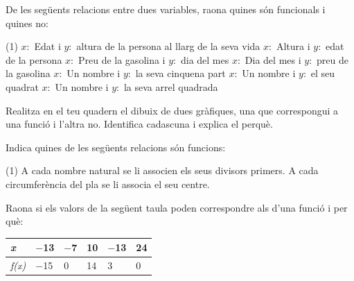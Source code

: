 \begin{mylist}
 
\exer \mental De les següents relacions entre dues variables, raona quines són funcionals i quines no:
\begin{tasks}(1)
   \task $x:$ Edat i $y:$ altura de la persona al llarg de la seva vida \hspace{1cm} \dotfill \hspace{1cm}
   \task $x:$ Altura i $y:$ edat de la persona \hspace{1cm} \dotfill \hspace{1cm}
   \task $x:$ Preu de la gasolina i $y:$ dia del mes \hspace{1cm} \dotfill \hspace{1cm}
   \task $x:$ Dia del mes i $y:$ preu de la gasolina \hspace{1cm} \dotfill \hspace{1cm}
   \task $x:$ Un nombre i $y:$ la seva cinquena part \hspace{1cm} \dotfill \hspace{1cm}
   \task $x:$ Un nombre i $y:$ el seu quadrat \hspace{1cm} \dotfill \hspace{1cm}
   \task $x:$ Un nombre i $y:$ la seva arrel quadrada \hspace{1cm} \dotfill \hspace{1cm}
\end{tasks}

\answers{[Sí, No, No, Sí, Sí, Sí, No]}

\exer  Realitza en el teu quadern el dibuix de dues gràfiques, una que correspongui a una funció i l'altra no. Identifica cadascuna i explica el perquè. 


\exer  Indica quines de les següents relacions són funcions:
\begin{tasks}(1)
	\task    A cada nombre natural se li associen els seus divisors primers.
	\task   A cada circumferència del pla se li associa el seu centre.
\end{tasks}


\exer  Raona si els valors de la següent taula poden correspondre als d'una funció i per què:


\begin{longtable}{|p{0.4in}|p{0.4in}|p{0.4in}|p{0.4in}|p{0.4in}|p{0.4in}|} \hline 
\cellcolor{lightgray}	\textit{x} & $-$13 & $-$7 & 10 & $-$13 & 24 \\ \hline 
\cellcolor{lightgray}	\textit{f(x)} & $-$15 & 0 & 14 & 3 & 0 \\ \hline 
\end{longtable}


\end{mylist}
